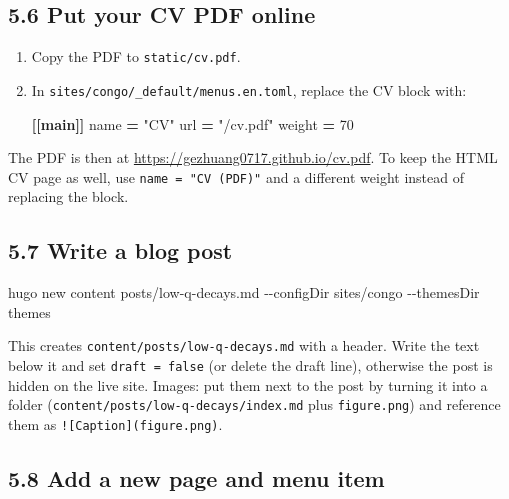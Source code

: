 \documentclass[
  10pt,
]{article}
\newenvironment{Shaded}{\begin{snugshade}}{\end{snugshade}}
\newcommand{\AttributeTok}[1]{\textcolor[rgb]{0.13,0.29,0.53}{#1}}
\newcommand{\DataTypeTok}[1]{\textcolor[rgb]{0.13,0.29,0.53}{#1}}
\newcommand{\DecValTok}[1]{\textcolor[rgb]{0.00,0.00,0.81}{#1}}
\newcommand{\ExtensionTok}[1]{#1}
\newcommand{\KeywordTok}[1]{\textcolor[rgb]{0.13,0.29,0.53}{\textbf{#1}}}
\newcommand{\NormalTok}[1]{#1}
\newcommand{\OperatorTok}[1]{\textcolor[rgb]{0.81,0.36,0.00}{\textbf{#1}}}
\newcommand{\StringTok}[1]{\textcolor[rgb]{0.31,0.60,0.02}{#1}}
\begin{document}
\hypertarget{put-your-cv-pdf-online}{%
\subsection{5.6 Put your CV PDF online}\label{put-your-cv-pdf-online}}

\begin{enumerate}
\def\labelenumi{\arabic{enumi}.}
\item
  Copy the PDF to \texttt{static/cv.pdf}.
\item
  In \texttt{sites/congo/\_default/menus.en.toml}, replace the CV block
  with:

\begin{Shaded}
\begin{Highlighting}[]
\KeywordTok{[[main]]}
  \DataTypeTok{name} \OperatorTok{=} \StringTok{"CV"}
  \DataTypeTok{url} \OperatorTok{=} \StringTok{"/cv.pdf"}
  \DataTypeTok{weight} \OperatorTok{=} \DecValTok{70}
\end{Highlighting}
\end{Shaded}
\end{enumerate}

The PDF is then at \url{https://gezhuang0717.github.io/cv.pdf}. To keep
the HTML CV page as well, use \texttt{name\ =\ "CV\ (PDF)"} and a
different weight instead of replacing the block.

\hypertarget{write-a-blog-post}{%
\subsection{5.7 Write a blog post}\label{write-a-blog-post}}

\begin{Shaded}
\begin{Highlighting}[]
\ExtensionTok{hugo}\NormalTok{ new content posts/low{-}q{-}decays.md }\AttributeTok{{-}{-}configDir}\NormalTok{ sites/congo }\AttributeTok{{-}{-}themesDir}\NormalTok{ themes}
\end{Highlighting}
\end{Shaded}

This creates \texttt{content/posts/low-q-decays.md} with a header. Write
the text below it and set \texttt{draft\ =\ false} (or delete the draft
line), otherwise the post is hidden on the live site. Images: put them
next to the post by turning it into a folder
(\texttt{content/posts/low-q-decays/index.md} plus \texttt{figure.png})
and reference them as \texttt{!{[}Caption{]}(figure.png)}.

\hypertarget{add-a-new-page-and-menu-item}{%
\subsection{5.8 Add a new page and menu
item}\label{add-a-new-page-and-menu-item}}
\end{document}
